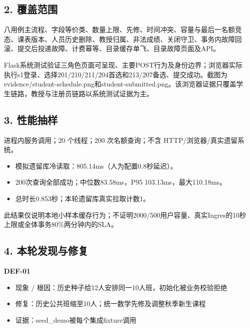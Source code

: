 \documentclass[UTF8,11pt,a4paper]{ctexart}
\providecommand{\tightlist}{\setlength{\itemsep}{0pt}\setlength{\parskip}{0pt}}
\begin{document}
\hypertarget{2-ux8986ux76d6ux8303ux56f4}{%
\subsection{2. 覆盖范围}\label{2-ux8986ux76d6ux8303ux56f4}}

八用例主流程、字段等价类、数量上限、先修、时间冲突、容量与最后一名额竞态、课表版本、人员历史删除、教授归属、非法成绩、关闭守卫、事务内故障回滚、提交后投递故障、计费幂等、目录缓存单飞、目录故障页面及API。

Flask系统测试验证三角色页面可呈现、主要POST行为及身份边界；浏览器实际执行s1登录、选择201/210/211/204首选和213/207备选、提交成功。截图为evidence/student-schedule.png和student-submitted.png。该浏览器证据只覆盖学生链路，教授与注册员链路以系统测试证据为主。

\hypertarget{3-ux6027ux80fdux62bdux6837}{%
\subsection{3. 性能抽样}\label{3-ux6027ux80fdux62bdux6837}}

进程内服务调用；20 个线程；200 次名额查询；不含
HTTP/浏览器/真实遗留系统。

\begin{itemize}
\tightlist
\item
  模拟遗留库冷读取：805.14ms（人为配置0.8秒延迟）。
\item
  200次查询全部成功；中位数83.58ms，P95 103.13ms，最大110.18ms。
\item
  总时长0.853秒；本轮遗留库真实拉取计数1。
\end{itemize}

此结果仅说明本地小样本缓存行为；不证明2000/500用户容量、真实Ingres的10秒上限或全体事务80\%两分钟内的SLA。

\hypertarget{4-ux672cux8f6eux53d1ux73b0ux4e0eux4feeux590d}{%
\subsection{4.
本轮发现与修复}\label{4-ux672cux8f6eux53d1ux73b0ux4e0eux4feeux590d}}

\textbf{DEF-01}

\begin{itemize}
\tightlist
\item
  现象 / 根因：历史种子给12人安排同一10人班，初始化被业务校验拒绝
\item
  修复：历史公共班缩至10人；统一数学先修及调整秋季新生课程
\item
  证据：seed\_\allowbreak{}demo被每个集成fixture调用
\end{itemize}
\end{document}
